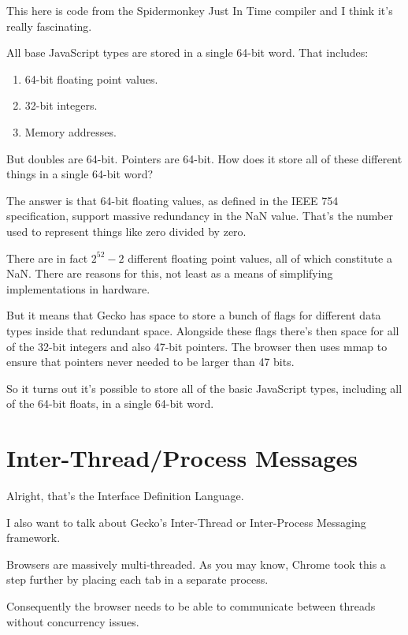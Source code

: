 \documentclass{article}
\begin{document}
This here is code from the Spidermonkey Just In Time compiler and I think it's really fascinating.

All base JavaScript types are stored in a single 64-bit word. That includes:

\begin{enumerate}
\item 64-bit floating point values.
\item 32-bit integers.
\item Memory addresses.
\end{enumerate}

But doubles are 64-bit. Pointers are 64-bit. How does it store all of these different things in a single 64-bit word?

The answer is that 64-bit floating values, as defined in the IEEE 754 specification, support massive redundancy in the NaN value. That's the number used to represent things like zero divided by zero.

There are in fact $2^52 - 2$ different floating point values, all of which constitute a NaN. There are reasons for this, not least as a means of simplifying implementations in hardware.

But it means that Gecko has space to store a bunch of flags for different data types inside that redundant space. Alongside these flags there's then space for all of the 32-bit integers and also 47-bit pointers. The browser then uses mmap to ensure that pointers never needed to be larger than 47 bits.

So it turns out it's possible to store all of the basic JavaScript types, including all of the 64-bit floats, in a single 64-bit word.


\section{Inter-Thread/Process Messages}

Alright, that's the Interface Definition Language.

I also want to talk about Gecko's Inter-Thread or Inter-Process Messaging framework.

Browsers are massively multi-threaded. As you may know, Chrome took this a step further by placing each tab in a separate process.

Consequently the browser needs to be able to communicate between threads without concurrency issues.
\end{document}
